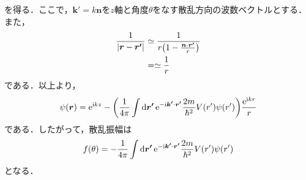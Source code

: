 \documentclass{report}
\begin{document}
    を得る．ここで，$\bm{k'} = k \bm{n}$を$z$軸と角度$\theta$をなす散乱方向の波数ベクトルとする．また，
    \begin{align}
      \frac{1}{\abs{\bm{r} - \bm{r'}}} &\simeq \frac{1}{r\qty(1 - \frac{\bm{n}\cdot\bm{r'}}{r})}\\
      &= \simeq \frac{1}{r}
    \end{align}
    である．以上より，
    \begin{align}
      \psi(\bm{r}) = \mathrm{e}^{\mathrm{i} kz} - \qty(\frac{1}{4\pi} \int \dd{\bm{r'}} \mathrm{e}^{- \mathrm{i} \bm{k'} \cdot \bm{r'}} \frac{2m}{\hbar^2}V(r')\psi(r'))\frac{\mathrm{e}^{\mathrm{i} kr}}{r}
    \end{align}
    である．したがって，散乱振幅は
    \begin{align}
      f(\theta) = -\frac{1}{4\pi} \int \dd{\bm{r'}} \mathrm{e}^{- \mathrm{i} \bm{k'} \cdot \bm{r'}} \frac{2m}{\hbar^2}V(r')\psi(r')
    \end{align}
    となる．
\end{document}
